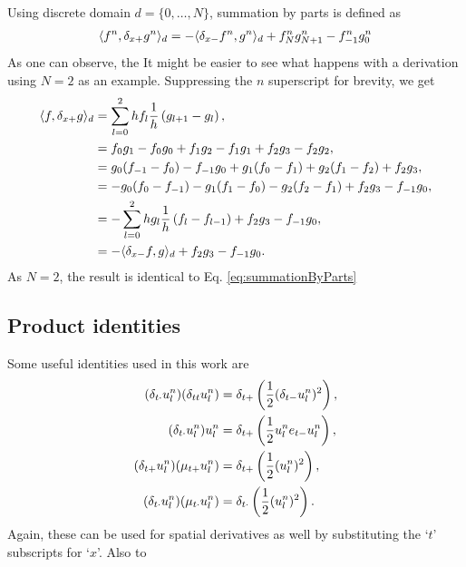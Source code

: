Using discrete domain $d=\{0, \hdots, N\}$, summation by parts is defined as \cite{theBible}
\begin{align}
    \langle f^n, \delta_{x+} g^n \rangle_d 
    = -\langle \delta_{x-} f^n, g^n\rangle_d + f_N^ng_{N+1}^n - f_{-1}^ng_0^n\label{eq:summationByParts}
\end{align}
As one can observe, the 
It might be easier to see what happens with a derivation using $N = 2$ as an example. Suppressing the $n$ superscript for brevity, we get 
\begin{align*}
    \langle f, \delta_{x+} g \rangle_d &= \sum_{l = 0}^2 h f_l\frac{1}{h}\left(g_{l+1} - g_l\right),\\
    &= f_0g_1 - f_0g_0 + f_1g_2 - f_1g_1 + f_2g_3-f_2g_2,\\
    &= g_0(f_{-1}-f_0) - f_{-1}g_0 + g_1(f_0-f_1) + g_2(f_1-f_2) + f_2g_3,\\
    &= -g_0(f_0-f_{-1}) - g_1(f_1 - f_0) - g_2(f_2-f_1) + f_2g_3 - f_{-1}g_0,\\
    &= -\sum_{l=0}^2 h g_l\frac{1}{h}\left(f_l - f_{l-1}\right) + f_2g_3 - f_{-1}g_0,\\
    &= -\langle \delta_{x-} f, g\rangle_d + f_2g_3 - f_{-1}g_0.
\end{align*}
As $N=2$, the result is identical to Eq. \eqref{eq:summationByParts}

\subsection{Product identities}
Some useful identities used in this work are
\begin{subequations}
    \begin{align}
        (\delta_{t\cdot} u_l^n)(\delta_{tt} u_l^n) &= \delta_{t+} \left(\frac{1}{2}(\delta_{t-} u_l^n)^2\right),\label{eq:prodIdentity1}\\
        (\delta_{t\cdot} u_l^n)u_l^n &= \delta_{t+} \left(\frac{1}{2}u_l^n e_{t-}u_l^n\right),\label{eq:prodIdentity2}\\
        (\delta_{t+} u_l^n)(\mu_{t+} u_l^n) &= \delta_{t+} \left(\frac{1}{2}(u_l^n)^2\right),\label{eq:prodIdentity3}\\
        (\delta_{t\cdot} u_l^n)(\mu_{t\cdot}u_l^n) &= \delta_{t\cdot}\left(\frac{1}{2} (u_l^n)^2\right).\label{eq:prodIdentity4}
    \end{align}
\end{subequations}
Again, these can be used for spatial derivatives as well by substituting the `$t$' subscripts for `$x$'. Also to 

